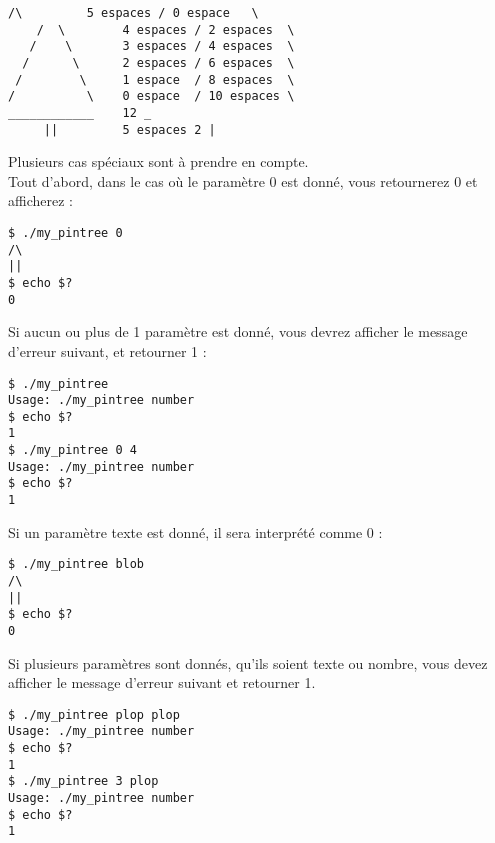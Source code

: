 \hspace*{-\parindent} %
\begin{minipage}{15.85cm} %
\lstset{language=sh}
\begin{lstlisting}[frame=single,title={Cas général 5}]
     /\         5 espaces / 0 espace   \
    /  \        4 espaces / 2 espaces  \
   /    \       3 espaces / 4 espaces  \
  /      \      2 espaces / 6 espaces  \
 /        \     1 espace  / 8 espaces  \
/          \    0 espace  / 10 espaces \
____________    12 _
     ||         5 espaces 2 |
\end{lstlisting}
\end{minipage} %

\bigskip

\noindent Plusieurs cas spéciaux sont à prendre en compte.\\

\noindent Tout d'abord, dans le cas où le paramètre 0 est donné, vous retournerez 0 et afficherez :

\bigskip

\lstset{language=sh}
\begin{lstlisting}[frame=single,title={Cas 0}]
$ ./my_pintree 0
/\
||
$ echo $?
0
\end{lstlisting}

\bigskip

\noindent Si aucun ou plus de 1 paramètre est donné, vous devrez afficher le message d'erreur suivant, et retourner 1 : \\

\bigskip

\noindent {}

\bigskip

\lstset{language=sh}
\begin{lstlisting}[frame=single,title={Cas d'erreur}]
$ ./my_pintree
Usage: ./my_pintree number
$ echo $?
1
$ ./my_pintree 0 4
Usage: ./my_pintree number
$ echo $?
1
\end{lstlisting}



\noindent Si un paramètre texte est donné, il sera interprété comme 0 :

\bigskip

\lstset{language=sh}
\begin{lstlisting}[frame=single,title={Cas texte}]
$ ./my_pintree blob
/\
||
$ echo $?
0
\end{lstlisting}

\bigskip

\noindent Si plusieurs paramètres sont donnés, qu'ils soient texte ou nombre, vous devez afficher le message d'erreur suivant et retourner 1.

\bigskip

\lstset{language=sh}
\begin{lstlisting}[frame=single,title={Cas texte d'erreur}]
$ ./my_pintree plop plop
Usage: ./my_pintree number
$ echo $?
1
$ ./my_pintree 3 plop
Usage: ./my_pintree number
$ echo $?
1
\end{lstlisting}
